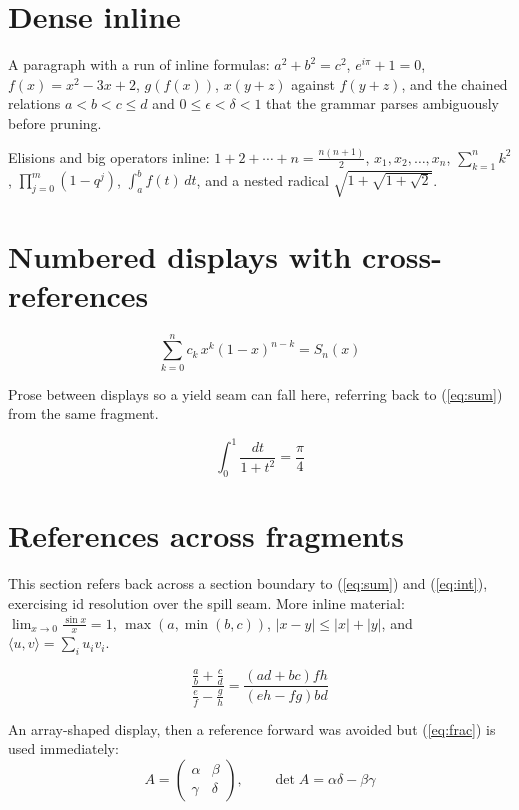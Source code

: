 \documentclass{article}
\begin{document}
\section{Dense inline}

A paragraph with a run of inline formulas: $a^2+b^2=c^2$, $e^{i\pi}+1=0$,
$f(x) = x^2 - 3x + 2$, $g(f(x))$, $x(y+z)$ against $f(y+z)$, and the chained
relations $a < b < c \leq d$ and $0 \leq \epsilon < \delta < 1$ that the
grammar parses ambiguously before pruning.

Elisions and big operators inline: $1 + 2 + \cdots + n = \frac{n(n+1)}{2}$,
$x_1, x_2, \ldots, x_n$, $\sum_{k=1}^{n} k^2$, $\prod_{j=0}^{m} (1 - q^j)$,
$\int_a^b f(t)\,dt$, and a nested radical $\sqrt{1+\sqrt{1+\sqrt{2}}}$.

\section{Numbered displays with cross-references}

\begin{equation}\label{eq:sum}
\sum_{k=0}^{n} c_k\, x^k (1-x)^{n-k} = S_n(x)
\end{equation}

Prose between displays so a yield seam can fall here, referring back to
(\ref{eq:sum}) from the same fragment.

\begin{equation}\label{eq:int}
\int_0^1 \frac{dt}{1+t^2} = \frac{\pi}{4}
\end{equation}

\section{References across fragments}

This section refers back across a section boundary to (\ref{eq:sum}) and
(\ref{eq:int}), exercising id resolution over the spill seam. More inline
material: $\lim_{x\to 0} \frac{\sin x}{x} = 1$, $\max(a, \min(b, c))$,
$|x - y| \leq |x| + |y|$, and $\langle u, v \rangle = \sum_i u_i v_i$.

\begin{equation}\label{eq:frac}
\frac{\frac{a}{b} + \frac{c}{d}}{\frac{e}{f} - \frac{g}{h}}
  = \frac{(ad+bc)fh}{(eh-fg)bd}
\end{equation}

An array-shaped display, then a reference forward was avoided but
(\ref{eq:frac}) is used immediately:
\begin{equation}
A = \left(\begin{array}{cc} \alpha & \beta \\ \gamma & \delta \end{array}\right),
\qquad \det A = \alpha\delta - \beta\gamma
\end{equation}
\end{document}

